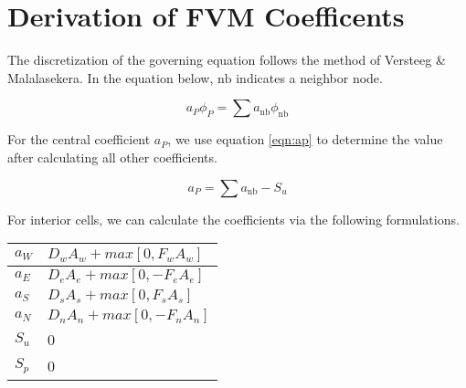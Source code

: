 \documentclass{article}
\begin{document}
\section{Derivation of FVM Coefficents}
The discretization of the governing equation follows the method of Versteeg \& Malalasekera.
In the equation below, $\mathrm{nb}$ indicates a neighbor node. 

\begin{equation}
   a_P \phi_P = \sum a_{\mathrm{nb}} \phi_{\mathrm{nb}}
\end{equation}

For the central coefficient $a_P$, we use equation \ref{eqn:ap} to determine the value after calculating all other coefficients.

\begin{equation}
   a_P = \sum a_{\mathrm{nb}} - S_u
   \label{eqn:ap}
\end{equation}

For interior cells, we can calculate the coefficients via the following formulations.
\begin{table}[!ht]
\centering
\begin{tabular}{|l|l|} \hline
   $a_W$ & $D_w A_w + max\left[0,  F_w A_w\right]$ \\ \hline
   $a_E$ & $D_e A_e + max\left[0, -F_e A_e\right]$ \\ \hline
   $a_S$ & $D_s A_s + max\left[0,  F_s A_s\right]$ \\ \hline
   $a_N$ & $D_n A_n + max\left[0, -F_n A_n\right]$ \\ \hline
   $S_u$ & 0 \\ \hline
   $S_p$ & 0 \\ \hline
\end{tabular}
\end{table}
\end{document}
